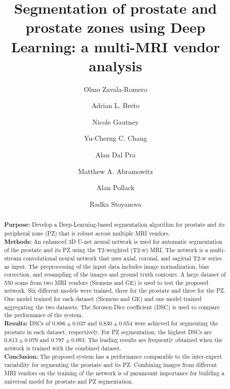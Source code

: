 \documentclass[num-refs]{wiley-article}
\title{ Segmentation of prostate and prostate zones using Deep Learning: a multi-MRI vendor analysis}
\author[1]{Olmo Zavala-Romero}
\author[1]{Adrian L. Breto }
\author[1]{Nicole Gautney}
\author[2]{Yu-Cherng C. Chang}
\author[1]{Alan Dal Pra}
\author[1]{Matthew A. Abramowitz}
\author[1]{Alan Pollack}
\author[1]{Radka Stoyanova}
\affil[1]{Department of Radiation Oncology, University of Miami Miller School of Medicine,
                Miami, FL, 33136, USA}
\affil[2]{University of Miami Miller School of Medicine,
                Miami, FL, 33136, USA}
\begin{document}
\maketitle

\begin{abstract} %
\textbf{Purpose:} Develop a Deep-Learning-based segmentation algorithm for prostate and its peripheral zone (PZ) that is robust across multiple MRI vendors. \\
\textbf{Methods:} An enhanced 3D U-net neural network is used for automatic segmentation of the prostate and its PZ using the T2-weighted (T2-w) MRI. The network is a multi-stream convolutional neural network that uses axial, coronal, and sagittal T2-w series as input. The preprocessing of the input data includes image normalization, bias correction, and resampling of the images and ground truth contours. A large dataset of 550 scans from two MRI vendors (Siemens and GE) is used to test the proposed network. Six different models were trained, three for the prostate and three for the PZ. One model trained for each dataset (Siemens and GE) and one model trained aggregating the two datasets. The S\o rosen-Dice coefficient (DSC) is used to compare the performance of the system. \\
\textbf{Results:} DSCs of $0.896 \pm 0.037$ and  $0.830 \pm 0.054$ were achieved for segmenting the prostate in each dataset, respectively. For PZ segmentation, the highest DSCs are $0.813 \pm 0.079$ and $0.797 \pm 0.093$. The leading results are frequently obtained when the network is trained with the combined dataset. \\
\textbf{Conclusion:} The proposed system has a performance comparable to the inter-expert variability for segmenting the prostate and its PZ. Combining images from different MRI vendors on the training of the network is of paramount importance for building a universal model for prostate and PZ segmentation. 
\end{abstract}






\end{document}
